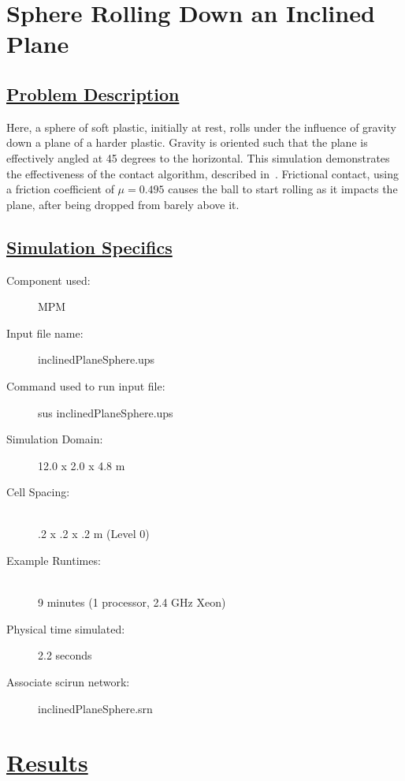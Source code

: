 \documentclass[fleqn]{article}
\begin{document}
\section*{\center Sphere Rolling Down an Inclined Plane}
\subsection*{\underline{Problem Description}}
Here, a sphere of soft plastic, initially at rest, rolls under the
influence of gravity down a plane of a harder plastic.  Gravity is
oriented such that the plane is effectively angled at 45 degrees to
the horizontal.  This simulation demonstrates the effectiveness of
the contact algorithm, described in~\cite{bard01}.  Frictional
contact, using a friction coefficient of $\mu = 0.495$ causes the ball
to start rolling as it impacts the plane, after being dropped from
barely above it.
 
\subsection*{\underline{Simulation Specifics}}
\begin{description} 
\item [Component used:] \hfill MPM
\item [Input file name:] \hfill inclinedPlaneSphere.ups
\item [Command used to run input file:]\hfill sus inclinedPlaneSphere.ups
\item [Simulation Domain:]\hfill    12.0 x 2.0 x 4.8 m

\item [Cell Spacing:]\hfill \\ 
.2 x .2 x .2 m (Level 0)

\item [Example Runtimes:] \hfill \\
 9 minutes  (1 processor, 2.4 GHz Xeon)\\

\item [Physical time simulated:] \hfill 2.2 seconds

\item [Associate scirun network:] \hfill inclinedPlaneSphere.srn

\end{description}

\section*{\underline{Results}}
\end{document}
